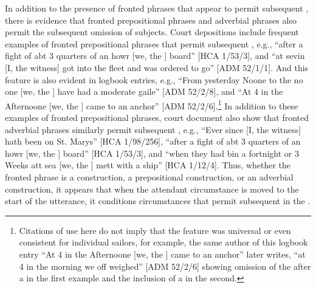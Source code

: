 In addition to the presence of fronted  phrases that appear to permit subsequent , there is evidence that fronted prepositional phrases and adverbial phrases also permit the subsequent omission of  subjects. Court depositions include frequent examples of fronted prepositional phrases that permit subsequent , e.g., “after a fight of abt 3 quarters of an howr [we, the ] board” [HCA 1/53/3], and “at sevin [I, the witness] got into the fleet and was ordered to go” [ADM 52/1/1]. And this feature is also evident in logbook entries, e.g., “From yesterday Noone to the no one [we, the ] have had a moderate gaile” [ADM 52/2/8], and “At 4 in the Afternoone [we, the ] came to an anchor” [ADM 52/2/6].\footnote{Citations of use here do not imply that the feature was universal or even consistent for individual sailors, for example, the same author of this logbook entry “At 4 in the Afternoone [we, the ] came to an anchor” later writes, “at 4 in the morning we off weighed” [ADM 52/2/6] showing omission of the  after a  in the first example and the inclusion of a  in the second.}  In addition to these examples of fronted prepositional phrases, court document also show that fronted adverbial phrases similarly permit subsequent , e.g., “Ever since [I, the witness] hath been on St. Marys” [HCA 1/98/256], “after a fight of abt 3 quarters of an howr [we, the ] board” [HCA 1/53/3], and “when they had bin a fortnight or 3 Weeks att sea [we, the ] mett with a ship” [HCA 1/12/4]. Thus, whether the fronted phrase is a  construction, a prepositional construction, or an adverbial construction, it appears that when the attendant circumstance is moved to the start of the utterance, it conditions circumstances that permit subsequent  in the . 

